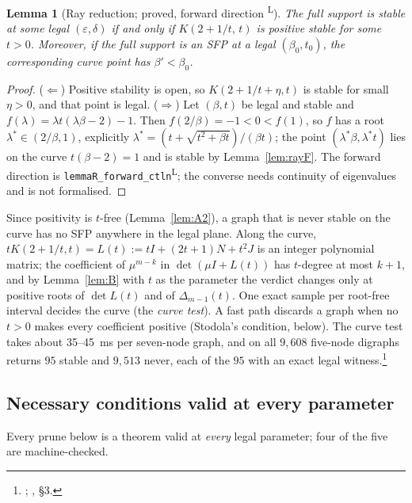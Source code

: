 \documentclass[11pt]{article}
\newtheorem{lemma}[theorem]{Lemma}
\theoremstyle{definition}
\newcommand{\eps}{\varepsilon}
\newcommand{\lean}{\textsuperscript{\textsf{L}}}
\begin{document}
\begin{lemma}[Ray reduction; proved, forward direction \lean]\label{lem:rayR}
The full support is stable at some legal $(\eps,\delta)$ if and only if $K(2+1/t,\,t)$ is positive stable for some
$t>0$. Moreover, if the full support is an SFP at a legal $(\beta_0,t_0)$, the corresponding curve point has
$\beta'<\beta_0$.
\end{lemma}
\begin{proof}
($\Leftarrow$) Positive stability is open, so $K(2+1/t+\eta,t)$ is stable for small $\eta>0$, and that point is legal.
($\Rightarrow$) Let $(\beta,t)$ be legal and stable and $f(\lambda)=\lambda t(\lambda\beta-2)-1$. Then $f(2/\beta)=-1<0<f(1)$, so
$f$ has a root $\lambda^*\in(2/\beta,1)$, explicitly $\lambda^*=(t+\sqrt{t^2+\beta t})/(\beta t)$; the point
$(\lambda^*\beta,\lambda^*t)$ lies on the curve $t(\beta-2)=1$ and is stable by Lemma~\ref{lem:rayF}.
The forward direction is \texttt{lemmaR\_forward\_ctln}\lean; the converse needs continuity of eigenvalues and is not
formalised.
\end{proof}

Since positivity is $t$-free (Lemma~\ref{lem:A2}), a graph that is never stable on the curve has no SFP anywhere in
the legal plane. Along the curve, $tK(2+1/t,t)=L(t):=tI+(2t+1)N+t^2J$ is an integer polynomial matrix; the coefficient
of $\mu^{m-k}$ in $\det(\mu I+L(t))$ has $t$-degree at most $k+1$, and by Lemma~\ref{lem:B} with $t$ as the parameter
the verdict changes only at positive roots of $\det L(t)$ and of $\Delta_{m-1}(t)$. One exact sample per root-free
interval decides the curve (the \emph{curve test}). A fast path discards a graph when no $t>0$ makes every coefficient
positive (Stodola's condition, below). The curve test takes about 35--45~ms per seven-node graph, and on all $9{,}608$
five-node digraphs returns $95$ stable and $9{,}513$ never, each of the $95$ with an exact legal witness.\footnote{; , \S3.}

\subsection{Necessary conditions valid at every parameter}\label{sec:prunes}
Every prune below is a theorem valid at \emph{every} legal parameter; four of the five are machine-checked.
\end{document}
